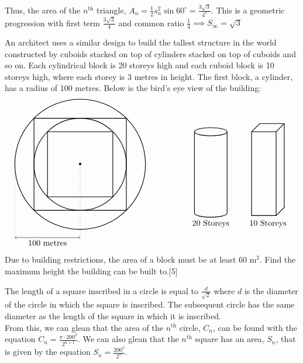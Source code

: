 \documentclass[12pt, a4 paper]{article}
\begin{document}
\begin{outline}[enumerate]
\begin{answer}
  Thus, the area of the \(n^{\textrm{th}}\) triangle, \(A_n = \frac{1}{2}s_n^2\sin{60^\circ} = \frac{3\sqrt3}{4^n}\). This is a geometric progression with first term \(\frac{3\sqrt3}{4}\) and common ratio \(\frac{1}{4} \implies S_\infty = \sqrt3\)
\end{answer}
 \2 An architect uses a similar design to build the tallest structure in the world constructed by cuboids stacked on top of cylinders stacked on top of cuboids and so on. Each cylindrical block is 20 storeys high and each cuboid block is 10 storeys high, where each storey is 3 metres in height. The first block, a cylinder, has a radius of 100 metres. Below is the bird's eye view of the building:
 \[
  \begin{tikzpicture}
   \draw[<->] (-80pt,-90pt) -- (-40pt,-90pt)node[below]{100 metres} -- (0,-90pt);
   \draw[dotted] (-80pt,-90pt) -- (-80pt,0);
   \draw[dotted] (0pt,-90pt) -- (0,0);
   \draw[thick] (0,0) circle (80pt);
   \draw[thick] (56.5685pt,56.5685pt) -- (-56.5685pt,56.5685pt) --(-56.5685pt,-56.5685pt) -- (56.5685pt,-56.5685pt) -- cycle;
   \draw[thick] (0,0) circle (56.5685pt);
   \draw[thick] (40pt,40pt) -- (-40pt,40pt) --(-40pt,-40pt) -- (40pt,-40pt) -- cycle;
   \draw[thick] (160pt,40pt) ellipse (20pt and 5pt);
   \draw[thick] (140pt,40pt) -- (140pt,-60pt) arc (180:360:20pt and 5pt) -- (180pt,40pt);
   \draw[thick] (210pt,40pt) rectangle (240pt,-63pt);
   \draw[thick] (210pt,40pt) -- (220pt,50pt) -- (250pt,50pt) -- (250pt,-53pt) -- (240pt,-63pt);
   \draw[thick] (250pt,50pt) -- (240pt,40pt);
   \draw (160pt,-65pt) node[below]{20 Storeys};
   \draw (230pt,-65pt) node[below]{10 Storeys};
   \node at (0,0) {\textbullet};
  \end{tikzpicture}
 \]
 Due to building restrictions, the area of a block must be at least 60 m\(^2\). Find the maximum height the building can be built to.\hfill[5]
 \begin{answer}
   The length of a square inscribed in a circle is equal to \(\frac{d}{\sqrt2}\) where \(d\) is the diameter of the circle in which the square is inscribed. The subsequent circle has the same diameter as the length of the square in which it is inscribed. \\

   From this, we can glean that the area of the \(n^{\textrm{th}}\) circle, \(C_n\), can be found with the equation \(C_n = \frac{\pi\cdot200^2}{2^{n+1}}\). We can also glean that the \(n^{\textrm{th}}\) square has an area, \(S_n\), that is given by the equation \(S_n = \frac{200^2}{2^n}\). \\


\end{answer}
\end{outline}
\end{document}
